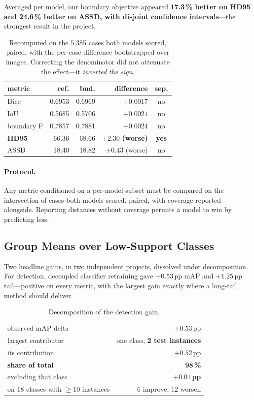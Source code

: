 \documentclass[10pt,twocolumn,letterpaper]{article}
\begin{document}
Averaged per model, our boundary objective appeared \textbf{17.3\,\% better on
HD95 and 24.6\,\% better on ASSD, with disjoint confidence intervals}---the
strongest result in the project.

\begin{table}[t]
\centering\small
\begin{tabular}{lrrrc}
\toprule
metric & ref. & bnd. & difference & sep. \\
\midrule
Dice & 0.6953 & 0.6969 & $+0.0017$ & no \\
IoU & 0.5685 & 0.5706 & $+0.0021$ & no \\
boundary F & 0.7857 & 0.7881 & $+0.0024$ & no \\
\textbf{HD95} & 66.36 & 68.66 & $\mathbf{+2.30}$ \textbf{(worse)} & \textbf{yes} \\
ASSD & 18.40 & 18.82 & $+0.43$ (worse) & no \\
\bottomrule
\end{tabular}
\caption{Recomputed on the 5{,}385 cases both models scored, paired, with the
per-case difference bootstrapped over images. Correcting the denominator did
not attenuate the effect---it \emph{inverted the sign}.}
\end{table}

\paragraph{Protocol.} Any metric conditioned on a per-model subset must be
compared on the intersection of cases both models scored, paired, with coverage
reported alongside. Reporting distances without coverage permits a model to win
by predicting less.

\subsection{Group Means over Low-Support Classes}

Two headline gains, in two independent projects, dissolved under decomposition.
For detection, decoupled classifier retraining gave $+0.53$\,pp mAP and
$+1.25$\,pp tail---positive on every metric, with the largest gain exactly where
a long-tail method should deliver.

\begin{table}[h]
\centering\small
\begin{tabular}{lr}
\toprule
observed mAP delta & $+0.53$\,pp \\
largest contributor & one class, \textbf{2 test instances} \\
its contribution & $+0.52$\,pp \\
\textbf{share of total} & \textbf{98\,\%} \\
excluding that class & \textbf{$+0.01$\,pp} \\
on 18 classes with ${\ge}10$ instances & 6 improve, 12 worsen \\
\bottomrule
\end{tabular}
\caption{Decomposition of the detection gain.}
\end{table}
\end{document}

